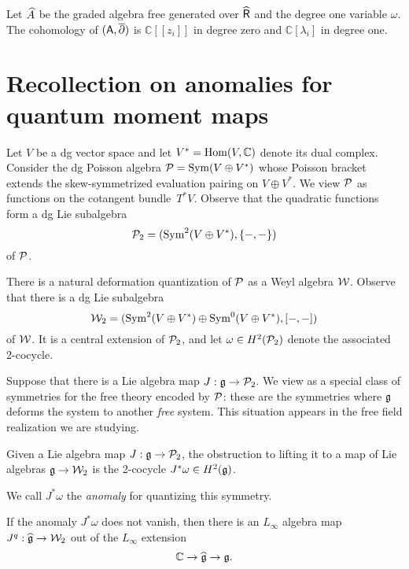 \documentclass[11pt]{amsart}
\def\C{{\mathbb{C}}}
\begin{document}
Let $\Hat{A}$ be the graded algebra free generated over $\Hat{\sfR}$ and the degree one variable $\omega$.
The cohomology of $(\sfA, \dbar)$ is $\C[[z_i]]$ in degree zero and $\C[\lambda_i]$ in degree one.

\section{Recollection on anomalies for quantum moment maps}

Let $V$ be a dg vector space and let $V^* = \Hom(V, \CC)$ denote its dual complex. 
Consider the dg Poisson algebra $\cP = \Sym(V \oplus V^*)$ whose Poisson bracket extends the skew-symmetrized evaluation pairing on $V \oplus V^*$.
We view $\cP$ as functions on the cotangent bundle~$T^* V$.
Observe that the quadratic functions form a dg Lie subalgebra
\[
\cP_2 = (\Sym^2(V \oplus V^*), \{-,-\})
\]
of $\cP$.

There is a natural deformation quantization of $\cP$ as a Weyl algebra $\cW$.
Observe that there is a dg Lie subalgebra
\[
\cW_2 = (\Sym^2(V \oplus V^*) \oplus \Sym^0(V \oplus V^*), [-,-])
\]
of $\cW$.
It is a central extension of $\cP_2$, and let $\omega \in H^2(\cP_2)$ denote the associated 2-cocycle.

Suppose that there is a Lie algebra map $J: \fg \to \cP_2$.
We view as a special class of symmetries for the free theory encoded by $\cP$:
these are the symmetries where $\fg$ deforms the system to another {\em free} system.
This situation appears in the free field realization we are studying.

\begin{lem}
Given a Lie algebra map $J: \fg \to \cP_2$, the obstruction to lifting it to a map of Lie algebras $\fg \to \cW_2$ is the 2-cocycle $J^* \omega \in H^2(\fg)$.
\end{lem}

We call $J^*\omega$ the {\em anomaly} for quantizing this symmetry.

\begin{cor}
If the anomaly $J^*\omega$ does not vanish, then there is an $L_\infty$ algebra map $J^q: \widehat{\fg} \to \cW_2$ out of the $L_\infty$ extension
\[
\CC \to \widehat{\fg} \to \fg.
\]
\end{cor}
\end{document}
